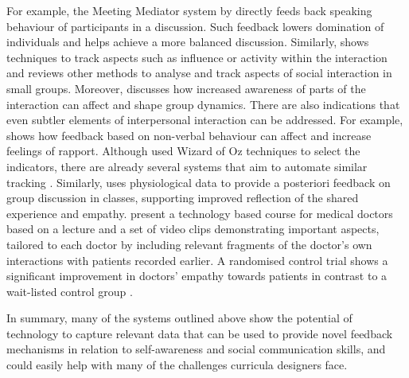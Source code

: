 \documentclass[prodmode,acmtochi]{acmsmall}
\newcommand{\rephrase}[1]{\textrm{\textrm{\textcolor{gray}{#1}}}}
\begin{document}
        For example, the Meeting Mediator system by  directly feeds back speaking behaviour of participants in a discussion. Such feedback lowers domination of individuals and helps achieve a more balanced discussion.  Similarly,  shows techniques to track aspects such as influence or activity within the interaction and  reviews other methods to analyse and track aspects of social interaction in small groups. Moreover,  discusses how increased awareness of parts of the interaction can affect and shape group dynamics. 
        There are also indications that even subtler elements of interpersonal interaction can be addressed. For example,  shows how feedback based on non-verbal behaviour can affect and increase feelings of rapport. Although  used Wizard of Oz techniques to select the indicators, there are already several systems that aim to automate similar tracking \cite{Sun2011,Hagad2011}. Similarly,  uses physiological data to provide a posteriori feedback on group discussion in classes, supporting improved reflection of the shared experience and empathy.  present a technology based course for medical doctors based on a lecture and a set of video clips demonstrating important aspects, tailored to each doctor by including relevant fragments of the doctor's own interactions with patients recorded earlier. A randomised control trial shows a significant improvement in doctors' empathy towards patients in contrast to a wait-listed control group \cite{Tulsky2011}. 


In summary, many of the systems outlined above show the potential of technology to capture relevant data that can be used to provide novel feedback mechanisms in relation to self-awareness and social communication skills, and could easily help with many of the challenges curricula designers face. %
        
\end{document}
